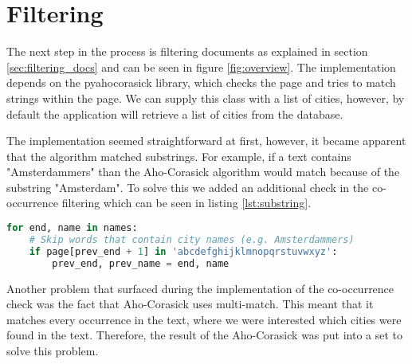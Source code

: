 \section{Filtering}\label{sec:5-filtering}
The next step in the process is filtering documents as explained in section \ref{sec:filtering_docs} and can be seen in figure \ref{fig:overview}. The implementation depends on the pyahocorasick library, which checks the page and tries to match strings within the page. We can supply this class with a list of cities, however, by default the application will retrieve a list of cities from the database.

The implementation seemed straightforward at first, however, it became apparent that the algorithm matched substrings. For example, if a text contains "Amsterdammers" than the Aho-Corasick algorithm would match because of the substring "Amsterdam". To solve this we added an additional check in the co-occurrence filtering which can be seen in listing \ref{lst:substring}.

\begin{lstlisting}[language=Python, caption=Additional check to prevent substring matches, label={lst:substring}]
for end, name in names:
    # Skip words that contain city names (e.g. Amsterdammers)
    if page[prev_end + 1] in 'abcdefghijklmnopqrstuvwxyz':
        prev_end, prev_name = end, name
\end{lstlisting}

Another problem that surfaced during the implementation of the co-occurrence check was the fact that Aho-Corasick uses multi-match. This meant that it matches every occurrence in the text, where we were interested which cities were found in the text. Therefore, the result of the Aho-Corasick was put into a set to solve this problem.
